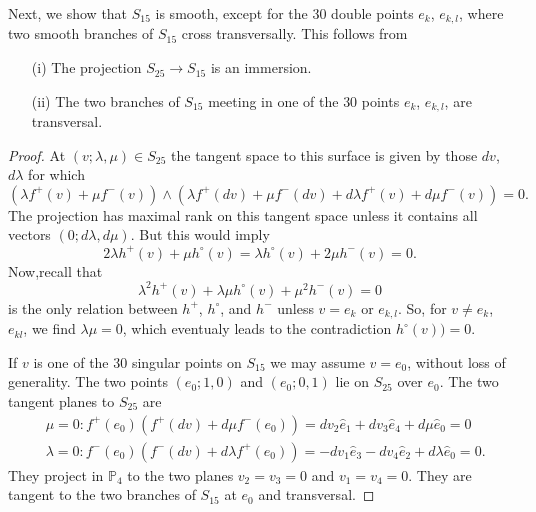 Next, we show that $S_{15}$ is smooth, except for the 30 double points
$e_{k}$, $e_{k,l}$, where two smooth branches of $S_{15}$ cross
transversally. This follows from

\begin{proposition}\label{chap2-prop10}
\begin{itemize}
\item[\rm(i)] The projection $S_{25}\to S_{15}$ is an immersion.

\item[\rm(ii)] The two branches of $S_{15}$ meeting in one of the $30$
points $e_{k}$, $e_{k,l}$, are transversal.
\end{itemize}
\end{proposition}

\begin{proof}
At $(v;\lambda,\mu)\in S_{25}$ the tangent space to this surface is
given by those $dv$, $d\lambda$ for which
$$
(\lambda f^{+}(v)+\mu f^{-}(v))\wedge (\lambda f^{+}(dv)+\mu
f^{-}(dv)+d\lambda f^{+}(v)+d\mu f^{-}(v))=0. 
$$
The projection has maximal rank on this tangent space unless it
contains all vectors $(0;d\lambda, d\mu)$. But this would imply
$$
2\lambda h^{+}(v)+\mu h^{\circ}(v)=\lambda h^{\circ}(v)+2\mu h^{-}(v)=0.
$$
Now,\pageoriginale recall that
$$
\lambda^{2}h^{+}(v)+\lambda \mu h^{\circ}(v)+\mu^{2}h^{-}(v)=0
$$
is the only relation between $h^{+}$, $h^{\circ}$, and $h^{-}$ unless
$v=e_{k}$ or $e_{k,l}$. So, for $v\neq e_{k}$, $e_{kl}$, we find
$\lambda \mu=0$, which eventualy leads to the contradiction
$h^{\circ}(v))=0$. 

If $v$ is one of the 30 singular points on $S_{15}$ we may assume
$v=e_{0}$, without loss of generality. The two points $(e_{0};1,0)$
and $(e_{0};0,1)$ lie on $S_{25}$ over $e_{0}$. The two tangent planes
to $S_{25}$ are 
\begin{align*}
& \mu=0:f^{+}(e_{0})(f^{+}(dv)+d\mu
f^{-}(e_{0}))=dv_{2}\widehat{e}_{1}+dv_{3}\widehat{e}_{4}+d\mu\widehat{e}_{0}=0\\
& \lambda=0:f^{-}(e_{0})(f^{-}(dv)+d\lambda
f^{+}(e_{0}))=-dv_{1}\widehat{e}_{3}-dv_{4}\widehat{e}_{2}+d\lambda \widehat{e}_{0}=0. 
\end{align*}
They project in $\mathbb{P}_{4}$ to the two planes $v_{2}=v_{3}=0$ and
$v_{1}=v_{4}=0$. They are tangent to the two branches of $S_{15}$ at
$e_{0}$ and transversal.
\end{proof}

